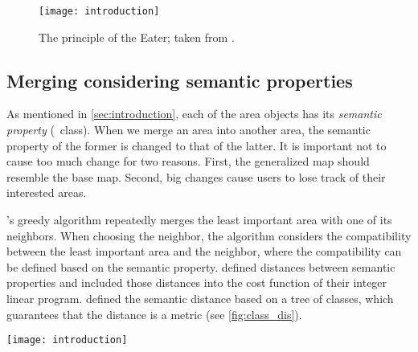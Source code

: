 \documentclass[twocolumn]{svjour3}          %
\begin{document}
\begin{figure}[tb]
\centering
\texttt{[image: introduction]}
\caption{The principle of the Eater;
taken from \citet{Suba2014Merge}.}
\label{fig:eater}
\end{figure}








\subsection{Merging considering semantic properties}

As mentioned in \sect\ref{sec:introduction}, 
each of the area objects has its \emph{semantic property} (\ie~class).
When we merge an area into another area, 
the semantic property of the former is changed to that of the latter.
It is important not to cause too much change for two reasons.
First, the generalized map should resemble the base map.
Second, big changes cause users to lose track of their interested areas.

's greedy algorithm repeatedly merges 
the least important area with one of its neighbors.
When choosing the neighbor, the algorithm considers 
the compatibility between the least important area and the neighbor,
where the compatibility can be defined based on the semantic property.
\citet{HaunertWolff2010AreaAgg} defined distances between semantic properties 
and included those distances into the cost function of their integer linear program.
\citet{Peng2020AreaAgg} defined the semantic distance 
based on a tree of classes,
which guarantees that the distance is a metric 
(see \fig\ref{fig:class_dis}).   


\begin{figure*}[tb]
\centering
\texttt{[image: introduction]}
\caption{A way of defining the distance of classes;
taken from \citet{Peng2020AreaAgg}.}
\label{fig:class_dis}
\end{figure*}
\end{document}
